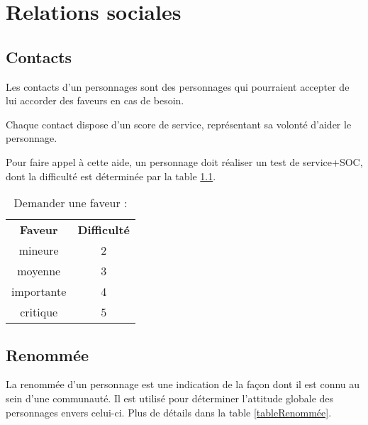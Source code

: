 \documentclass[10pt,a4paper,twocolumn]{book}
\begin{document}
\chapter{Relations sociales}
\section{Contacts}
Les contacts d’un personnages sont des personnages qui pourraient accepter de lui accorder des faveurs en cas de besoin.

Chaque contact dispose d’un score de service, représentant sa volonté d’aider le personnage.

Pour faire appel à cette aide, un personnage doit réaliser un test de service+SOC, dont la difficulté est déterminée par la table \ref{tableFaveurs}.

\begin{table}
\caption{ Demander une faveur :}
\label{tableFaveurs}
\begin{center}
\begin{tabular}{cc}
\textbf{Faveur} & \textbf{Difficulté} \\
   mineure & 2  \\
   moyenne & 3  \\
   importante & 4 \\
   critique & 5\\
\end{tabular}
\end{center}
\end{table}
\section{Renommée}
La renommée d’un personnage est une indication de la façon dont il est connu au sein d’une communauté. Il est utilisé pour déterminer l’attitude globale des personnages envers celui-ci. Plus de détails dans la table \ref{tableRenommée}.
\end{document}
